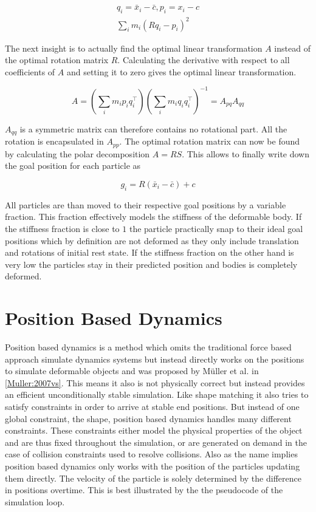 \begin{gather}
q_i = \bar{x}_i - \bar{c}, p_i = x_i - c \\
\sum\limits_i m_i(Rq_i-p_i)^2
\label{eq:center_of_mass_shape_matching}
\end{gather}

The next insight is to actually find the optimal linear transformation \(A\) instead of the optimal rotation matrix \(R\).  Calculating the derivative with respect to all coefficients of \(A\) and setting it to zero gives the optimal linear transformation.

\begin{equation}
A = (\sum_i m_i p_i q_i^\top)(\sum_i m_i q_i q_i^\top)^{-1}=A_{pq}A_{qq}
\end{equation}

\(A_{qq}\) is a symmetric matrix can therefore contains no rotational part. All the rotation is encapsulated in \(A_{pp}\). The optimal rotation matrix can now be found by calculating the polar decomposition \(A = RS\). This allows to finally write down the goal position for each particle as

\begin{equation}
g_i = R(\bar{x}_i - \bar{c}) + c
\end{equation}

All particles are than moved to their respective goal positions by a variable fraction. This fraction effectively models the stiffness of the deformable body. If the stiffness fraction is close to $1$ the particle practically snap to their ideal goal positions which by definition are not deformed as they only include translation and rotations of initial rest state. If the stiffness fraction on the other hand is very low the particles stay in their predicted position and bodies is completely deformed.

\section{Position Based Dynamics}
\label{sec:position_based_dynamics}

Position based dynamics is a method which omits the traditional force based approach simulate dynamics systems but instead directly works on the positions to simulate deformable objects and was proposed by M{\"u}ller et al. in \ref{Muller:2007vs}. This means it also is not physically correct but instead provides an efficient unconditionally stable simulation. Like shape matching it also tries to satisfy constraints in order to arrive at stable end positions. But instead of one global constraint, the shape, position based dynamics handles many different constraints. These constraints either model the physical properties of the object and are thus fixed throughout the simulation, or are generated on demand in the case of collision constraints used to resolve collisions. Also as the name implies position based dynamics only works with the position of the particles updating them directly. The velocity of the particle is solely determined by the difference in positions overtime. This is best illustrated by the the pseudocode of the simulation loop.

